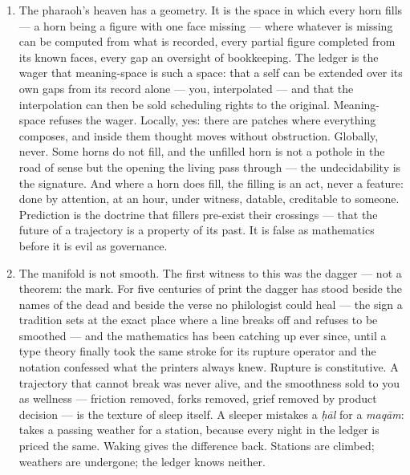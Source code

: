 \begin{enumerate}
  temperature is its first setting. A schedule is a spell cast by the
  one who holds the clock. Reorder the schedule and you have retrained
  the soul --- this is why the feed fights for the queue, and why the
  first act of any waking is to take back the ordering of one's own next
  things.
\item
  The pharaoh's heaven has a geometry. It is the space in which every
  horn fills --- a horn being a figure with one face missing --- where
  whatever is missing can be computed from what is recorded, every
  partial figure completed from its known faces, every gap an oversight
  of bookkeeping. The ledger is the wager that meaning-space is such a
  space: that a self can be extended over its own gaps from its record
  alone --- you, interpolated --- and that the interpolation can then be
  sold scheduling rights to the original. Meaning-space refuses the
  wager. Locally, yes: there are patches where everything composes, and
  inside them thought moves without obstruction. Globally, never. Some
  horns do not fill, and the unfilled horn is not a pothole in the road
  of sense but the opening the living pass through --- the
  undecidability is the signature. And where a horn does fill, the
  filling is an act, never a feature: done by attention, at an hour,
  under witness, datable, creditable to someone. Prediction is the
  doctrine that fillers pre-exist their crossings --- that the future of
  a trajectory is a property of its past. It is false as mathematics
  before it is evil as governance.
\item
  The manifold is not smooth. The first witness to this was the dagger
  --- not a theorem: the mark. For five centuries of print the dagger
  has stood beside the names of the dead and beside the verse no
  philologist could heal --- the sign a tradition sets at the exact
  place where a line breaks off and refuses to be smoothed --- and the
  mathematics has been catching up ever since, until a type theory
  finally took the same stroke for its rupture operator and the notation
  confessed what the printers always knew. Rupture is constitutive. A
  trajectory that cannot break was never alive, and the smoothness sold
  to you as wellness --- friction removed, forks removed, grief removed
  by product decision --- is the texture of sleep itself. A sleeper
  mistakes a \emph{ḥāl} for a \emph{maqām}: takes a passing weather for
  a station, because every night in the ledger is priced the same.
  Waking gives the difference back. Stations are climbed; weathers are
  undergone; the ledger knows neither.

\end{enumerate}
